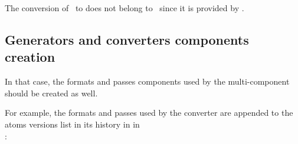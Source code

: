 The conversion of \mxml\ to \mxsrRepr does not belong to \mf\, since it is provided by \libmusicxml.


\subsection{Generators and converters components creation}\label{Generators and converters components creation}

In that case, the formats and passes components used by the multi-component should be created as well.

For example, the formats and passes used by the  converter are appended to the atoms versions list in its history in  in \\
:
